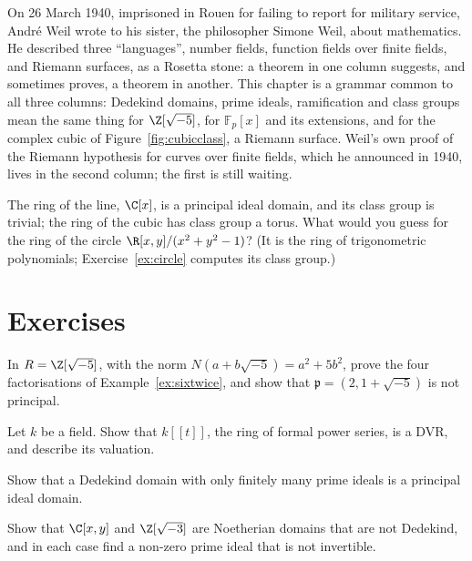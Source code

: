 \begin{beauty}
On 26 March 1940, imprisoned in Rouen for failing to report for military service, André Weil wrote to his sister, the philosopher Simone Weil, about mathematics. He described three ``languages'', number fields, function fields
over finite fields, and Riemann surfaces, as a Rosetta stone: a theorem in one column suggests, and sometimes proves, a theorem in another. This chapter is a grammar common to all three columns: Dedekind domains, prime
ideals, ramification and class groups mean the same thing for $\Z[\sqrt{-5}]$, for $\mathbb F_p[x]$ and its extensions, and for the complex cubic of Figure~\ref{fig:cubicclass}, a Riemann surface. Weil's own proof of the Riemann hypothesis for curves over finite fields, which he announced in 1940,
lives in the second column; the first is still waiting.
\end{beauty}

\begin{think}
The ring of the line, $\C[x]$, is a principal ideal domain, and its class group is trivial; the ring of the cubic has class group a torus. What would you guess for the ring of the circle $\R[x,y]/(x^2+y^2-1)$? (It is the ring
of trigonometric polynomials; Exercise~\ref{ex:circle} computes its class group.)
\end{think}

\section{Exercises}

\begin{exercise}[$\star$]\label{ex:zsqrt5}
In $R=\Z[\sqrt{-5}]$, with the norm $N(a+b\sqrt{-5})=a^2+5b^2$, prove the four factorisations of Example~\ref{ex:sixtwice}, and show that $\mathfrak p=(2,1+\sqrt{-5})$ is not principal.
\end{exercise}

\begin{exercise}[$\star$]\label{ex:powerseries}
Let $k$ be a field. Show that $k[[t]]$, the ring of formal power series, is a DVR, and describe its valuation.
\end{exercise}

\begin{exercise}[$\star\star$]\label{ex:semilocal}
Show that a Dedekind domain with only finitely many prime ideals is a principal ideal domain.
\end{exercise}

\begin{exercise}[$\star\star$]\label{ex:notdedekind}
Show that $\C[x,y]$ and $\Z[\sqrt{-3}]$ are Noetherian domains that are not Dedekind, and in each case find a non-zero prime ideal that is not invertible.
\end{exercise}

